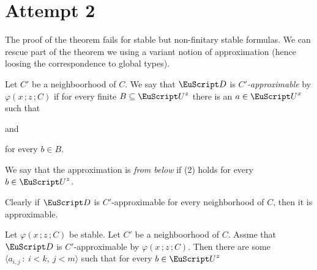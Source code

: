 \begin{comment}
\begin{proof}
  Let $k$ such that every $m$-coloring of a graph of size $k$ has a monocromatic subgraph of size $>m$ 
  Let $\langle \bar a_i\,;b_i\,;C_i\ :\ i<k\rangle$ be a sequence witnessing instability.
  then for every $i<n<m$ either ${\sim}\varphi(a_{j,n}\,;b_i\,;C_i)$ for some $j<m$.
  By Ramsey theorem we can assume that there is a $j<m$ such that ${\sim}\varphi(a_{j,n}\,;b_i\,;C_i)$ obtains for $>m$ many $i$.
  Then we can extract a subsequence that contradicts the maximality of $m$.
\end{proof}

\end{comment}
\section{Attempt 2}

The proof of the theorem fails for stable but non-finitary stable formulas.
We can rescue part of the theorem we using a variant notion of approximation (hence loosing the correspondence to global types).

\begin{definition}\label{def_approx}\strut
  Let $C'$ be a neighboorhood of $C$.
  We say that ${\EuScript D}$ is \emph{$C'$-approximable\/} by $\varphi(x\,;z\,;C)$ if for every finite $B\subseteq {\EuScript U}^z$ there is an $a\in {\EuScript U}^x$ such that\smallskip

  \quad and\smallskip

  \hfill for every $b\in B$.\smallskip

  We say that the approximation is \emph{from below\/} if (2) holds for every $b\in{\EuScript U}^z$.
\end{definition}



Clearly if ${\EuScript D}$ is $C'$-approximable for every neighborhood of $C$, then it is approximable.

\begin{lemma}\label{lem_stability_definability}
  Let $\varphi(x\,;z\,;C)$ be stable.
  Let $C'$ be a neighboorhood of $C$.
  Assme that ${\EuScript D}$ is $C'$-approximable by $\varphi(x\,;z\,;C)$.
  Then there are some $\langle a_{i,j}\ :\ i< k,\ j<m\rangle$ such that for every $b\in{\EuScript U}^z$

  \medskip

\end{lemma}

